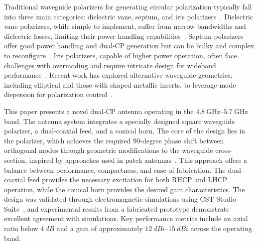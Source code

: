 \documentclass[lettersize,journal]{IEEEtran}
\newcommand{\frequencyrange}{\qtyrange{4.8}{5.7}{\giga\hertz}}
\begin{document}
Traditional waveguide polarizers for generating circular polarization typically fall into three main categories: dielectric vane, septum, and iris polarizers~\cite{cite3, cite4, cite5}. Dielectric vane polarizers, while simple to implement, suffer from narrow bandwidths and dielectric losses, limiting their power handling capabilities~\cite{cite6}. Septum polarizers offer good power handling and dual-CP generation but can be bulky and complex to reconfigure~\cite{ruiz-cruz-et-al:compact-reconfigurable-waveguide-circular-polarizer, wang-et-al:novel-square-rectangle-waveguide-septum-polarizer}. Iris polarizers, capable of higher power operation, often face challenges with overmoding and require intricate design for wideband performance~\cite{song-et-al:design-of-wideband-quad-ridge-waveguide-polarizer, virone-et-al:optimum-iris-set-concept-for-waveguide-polarizers, piltyay-et-al:new-tunable-iris-post-square-waveguide-polarizers-for-satelliste-information-systems}. Recent work has explored alternative waveguide geometries, including elliptical and those with shaped metallic inserts, to leverage mode dispersion for polarization control~\cite{yu-et-al:a-wideband-circularly-polarized-horn-antenna-with-a-tapered-elliptical-waveguide-polarizer, rud-shpachenko:polarizers-on-sections-of-square-waveguides-with-inner-corner-ridges, bhardwaj-volakis:hexagonal-waveguides-new-class-of-waveguides-for-mmwave-circularly-polarized-horns, bhardwaj-volakis:hexagonal-waveguide-based-circularly-polarized-horn-antennas-for-submmwave-terahertz-band, bhardwaj-volakis:circularly-polarized-horn-antennas-for-terahertz-communications-using-differential-mode-dispersion-in-hexagonal-waveguides, garcia-marin-masa-campos:bowtie-shaped-radiating-element-for-single-and-dual-circular-polarization}.

This paper presents a novel dual-CP antenna operating in the $\frequencyrange$ band. The antenna system integrates a specially designed square waveguide polarizer, a dual-coaxial feed, and a conical horn. The core of the design lies in the polarizer, which achieves the required 90-degree phase shift between orthogonal modes through geometric modifications to the waveguide cross-section, inspired by approaches used in patch antennas~\cite{cite_patch_antenna}. This approach offers a balance between performance, compactness, and ease of fabrication. The dual-coaxial feed provides the necessary excitation for both RHCP and LHCP operation, while the conical horn provides the desired gain characteristics. The design was validated through electromagnetic simulations using CST Studio Suite~\cite{cst}, and experimental results from a fabricated prototype demonstrate excellent agreement with simulations. Key performance metrics include an axial ratio below $\qty{4}{dB}$ and a gain of approximately $\qtyrange{12}{15}{dBi}$ across the operating band.
\end{document}

